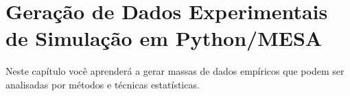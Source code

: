 \chapter{Geração de Dados Experimentais de Simulação em Python/MESA}

Neste capítulo você aprenderá a gerar massas de dados empíricos que podem ser analisadas por métodos e técnicas estatísticas.

